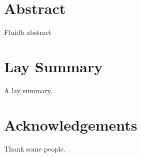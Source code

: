 \setcounter{page}{1}%

\maketitle%

\begin{precontent}

\chapter{Abstract}%
Fluidb abstract


\chapter{Lay Summary}%
A lay summary.

\chapter{Acknowledgements}%
Thank some people.





\end{precontent}


\tableofcontents

\cleardoublepage
{}
{}
\listoffigures

\cleardoublepage%
